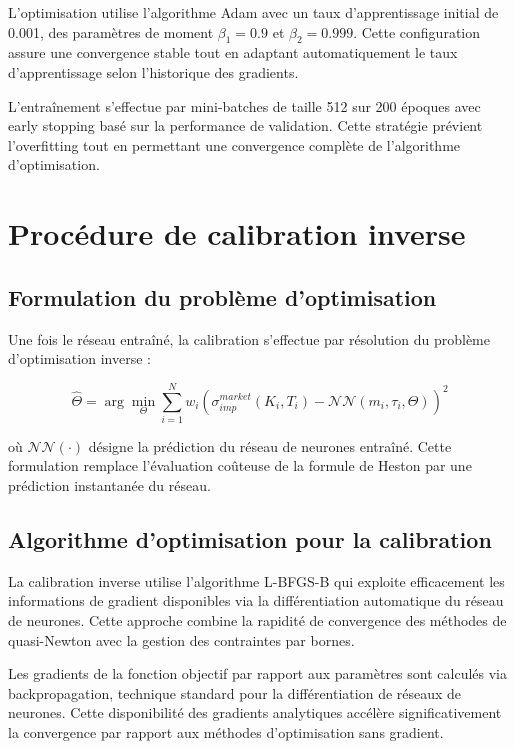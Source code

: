L'optimisation utilise l'algorithme Adam avec un taux d'apprentissage initial de 0.001, des paramètres de moment $\beta_1 = 0.9$ et $\beta_2 = 0.999$. Cette configuration assure une convergence stable tout en adaptant automatiquement le taux d'apprentissage selon l'historique des gradients.

L'entraînement s'effectue par mini-batches de taille 512 sur 200 époques avec early stopping basé sur la performance de validation. Cette stratégie prévient l'overfitting tout en permettant une convergence complète de l'algorithme d'optimisation.

\section{Procédure de calibration inverse}

\subsection{Formulation du problème d'optimisation}

Une fois le réseau entraîné, la calibration s'effectue par résolution du problème d'optimisation inverse :

\begin{equation}
\hat{\Theta} = \arg\min_{\Theta} \sum_{i=1}^{N} w_i \left(\sigma_{imp}^{market}(K_i, T_i) - \mathcal{NN}(m_i, \tau_i, \Theta)\right)^2
\end{equation}

où $\mathcal{NN}(\cdot)$ désigne la prédiction du réseau de neurones entraîné. Cette formulation remplace l'évaluation coûteuse de la formule de Heston par une prédiction instantanée du réseau.

\subsection{Algorithme d'optimisation pour la calibration}

La calibration inverse utilise l'algorithme L-BFGS-B qui exploite efficacement les informations de gradient disponibles via la différentiation automatique du réseau de neurones. Cette approche combine la rapidité de convergence des méthodes de quasi-Newton avec la gestion des contraintes par bornes.

Les gradients de la fonction objectif par rapport aux paramètres sont calculés via backpropagation, technique standard pour la différentiation de réseaux de neurones. Cette disponibilité des gradients analytiques accélère significativement la convergence par rapport aux méthodes d'optimisation sans gradient.

